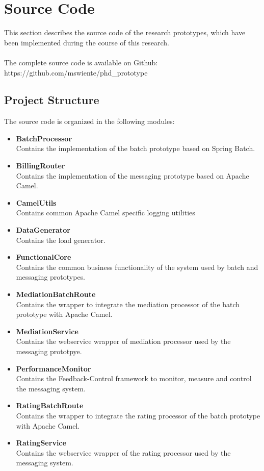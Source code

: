 \chapter{Source Code}\label{ch:appendix_source_code}

This section describes the source code of the research prototypes, which have been implemented during the course of this research.
\\\\
The complete source code is available on Github:\\
https://github.com/mswiente/phd\_prototype

\section{Project Structure}

The source code is organized in the following modules:

\begin{itemize}
\item \textbf{BatchProcessor}\\
Contains the implementation of the batch prototype based on Spring Batch.
\item \textbf{BillingRouter}\\
Contains the implementation of the messaging prototype based on Apache Camel.
\item \textbf{CamelUtils}\\
Contains common Apache Camel specific logging utilities
\item \textbf{DataGenerator}\\
Contains the load generator.
\item \textbf{FunctionalCore}\\
Contains the common business functionality of the system used by batch and messaging prototypes.
\item \textbf{MediationBatchRoute}\\
Contains the wrapper to integrate the mediation processor of the batch prototype with Apache Camel.
\item \textbf{MediationService}\\
Contains the webservice wrapper of mediation processor used by the messaging prototpye.
\item \textbf{PerformanceMonitor}\\
Contains the Feedback-Control framework to monitor, measure and control the messaging system.
\item \textbf{RatingBatchRoute}\\
Contains the wrapper to integrate the rating processor of the batch prototype with Apache Camel.
\item \textbf{RatingService}\\
Contains the webservice wrapper of the rating processor used by the messaging system.
\end{itemize}